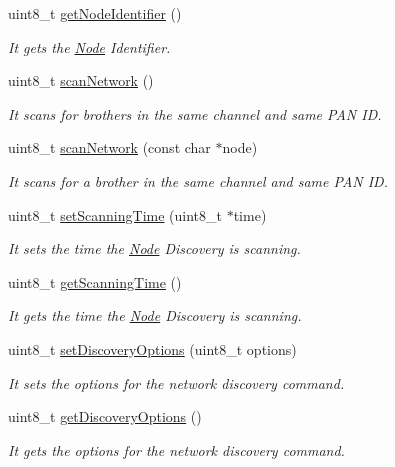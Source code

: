 \begin{DoxyCompactItemize}
uint8\+\_\+t \hyperlink{class_wasp_x_bee_core_aec8b2034612b6198caae23e970f70a51}{get\+Node\+Identifier} ()
\begin{DoxyCompactList}\small\item\em It gets the \hyperlink{struct_node}{Node} Identifier. \end{DoxyCompactList}\item 
uint8\+\_\+t \hyperlink{class_wasp_x_bee_core_aad3522b1ae7cde32bf9be127558b34f1}{scan\+Network} ()
\begin{DoxyCompactList}\small\item\em It scans for brothers in the same channel and same P\+AN ID. \end{DoxyCompactList}\item 
uint8\+\_\+t \hyperlink{class_wasp_x_bee_core_a6a0b38d9f6d23b81155742287ee943dd}{scan\+Network} (const char $\ast$node)
\begin{DoxyCompactList}\small\item\em It scans for a brother in the same channel and same P\+AN ID. \end{DoxyCompactList}\item 
uint8\+\_\+t \hyperlink{class_wasp_x_bee_core_a76ca42119faae27647ca40599d140c6d}{set\+Scanning\+Time} (uint8\+\_\+t $\ast$time)
\begin{DoxyCompactList}\small\item\em It sets the time the \hyperlink{struct_node}{Node} Discovery is scanning. \end{DoxyCompactList}\item 
uint8\+\_\+t \hyperlink{class_wasp_x_bee_core_a5f72182024b9ac8234464072148a7b88}{get\+Scanning\+Time} ()
\begin{DoxyCompactList}\small\item\em It gets the time the \hyperlink{struct_node}{Node} Discovery is scanning. \end{DoxyCompactList}\item 
uint8\+\_\+t \hyperlink{class_wasp_x_bee_core_ae0f55c26c6a0ffc5fef09f0b6ccefcf8}{set\+Discovery\+Options} (uint8\+\_\+t options)
\begin{DoxyCompactList}\small\item\em It sets the options for the network discovery command. \end{DoxyCompactList}\item 
uint8\+\_\+t \hyperlink{class_wasp_x_bee_core_ad3f63098910b1377fff143a267dbe042}{get\+Discovery\+Options} ()
\begin{DoxyCompactList}\small\item\em It gets the options for the network discovery command. \end{DoxyCompactList}\item 

\end{DoxyCompactItemize}
